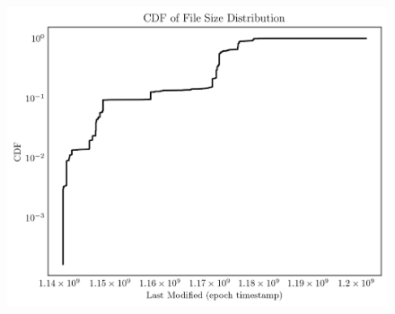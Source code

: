 \documentclass{article}
\begin{document}
\begin{figure}[htbp]
\centering
\includegraphics[width=\linewidth]{./images/last_modified_size_cdf.png}
\end{figure}

\newpage
\printbibliography
\end{document}
